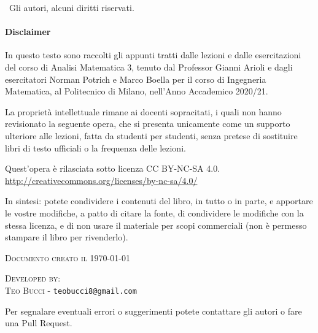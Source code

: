 
\textcopyright \ Gli autori, alcuni diritti riservati.

\paragraph{Disclaimer} In questo testo sono raccolti gli appunti tratti dalle lezioni e dalle esercitazioni del corso di Analisi Matematica 3, tenuto dal Professor Gianni Arioli e dagli esercitatori Norman Potrich e Marco Boella per il corso di Ingegneria Matematica, al Politecnico di Milano, nell'Anno Accademico 2020/21.

La proprietà intellettuale rimane ai docenti sopracitati, i quali non hanno revisionato la seguente opera, che si presenta unicamente come un supporto ulteriore alle lezioni, fatta da studenti per studenti, senza pretese di sostituire libri di testo ufficiali o la frequenza delle lezioni.

Quest'opera è rilasciata sotto licenza CC BY-NC-SA 4.0.\\
\url{http://creativecommons.org/licenses/by-nc-sa/4.0/}

In sintesi: potete condividere i contenuti del libro, in tutto o in parte, e apportare le vostre modifiche, a patto di citare la fonte, di condividere le modifiche con la stessa licenza, e di non usare il materiale per scopi commerciali (non è permesso stampare il libro per rivenderlo).



\textsc{Documento creato il \today}


\textsc{Developed by:}\\
\textsc{Teo Bucci} - \texttt{teobucci8@gmail.com}

Per segnalare eventuali errori o suggerimenti potete contattare gli autori o fare una Pull Request.

